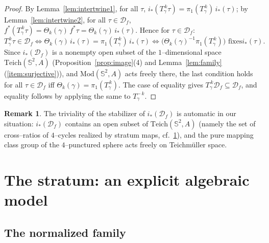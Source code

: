 \documentclass[11pt]{amsart}
\theoremstyle{plain}
\theoremstyle{definition}
\newtheorem{remark}[theorem]{Remark}
\newcommand{\Sph}{\mathbb{S}^2}
\newcommand{\Teich}{\mathrm{Teich}}
\newcommand{\Mod}{\mathrm{Mod}}
\newcommand{\D}{\mathcal{D}}
\newcommand{\S}{\mathcal{S}}
\begin{document}
\begin{proof}
By Lemma~\ref{lem:intertwine1}, for all $\tau$,
$i_*(T_\gamma^{\,k}\tau)=\pi_1(T_\gamma^{\,k})\,i_*(\tau)$; by
Lemma~\ref{lem:intertwine2}, for all $\tau\in\D_f$,
$f^{*}(T_\gamma^{\,k}\tau)=\Theta_k(\gamma)\,f^{*}\tau
=\Theta_k(\gamma)\,i_*(\tau)$.
Hence for $\tau\in\D_f$:
$$T_\gamma^{\,k}\tau\in\D_f
\iff \Theta_k(\gamma)\,i_*(\tau)=\pi_1(T_\gamma^{\,k})\,i_*(\tau)
\iff \bigl(\Theta_k(\gamma)^{-1}\pi_1(T_\gamma^{\,k})\bigr)\text{ fixes
}i_*(\tau).$$
Since $i_*(\D_f)$ is a nonempty open subset of the $1$--dimensional space
$\Teich(\Sph,A)$ (Proposition~\ref{prop:image}(4) and
Lemma~\ref{lem:family}(\ref{item:surjective})), and $\Mod(\Sph,A)$ acts
freely there, the last condition holds for all $\tau\in\D_f$ iff
$\Theta_k(\gamma)=\pi_1(T_\gamma^{\,k})$.  The case of equality gives
$T_\gamma^{\,k}\D_f\subseteq\D_f$, and equality follows by applying the
same to $T_\gamma^{-\,k}$.
\end{proof}

\begin{remark}
The triviality of the stabilizer of $i_*(\D_f)$ is automatic in our
situation: $i_*(\D_f)$ contains an open subset of $\Teich(\Sph,A)$
(namely the set of cross--ratios of $4$--cycles realized by stratum maps,
cf.\ \S\ref{s:stratum}), and the pure mapping class group of the
$4$--punctured sphere acts freely on Teichm\"uller space.
\end{remark}

\section{The stratum: an explicit algebraic model}\label{s:stratum}

\subsection{The normalized family}
\end{document}

